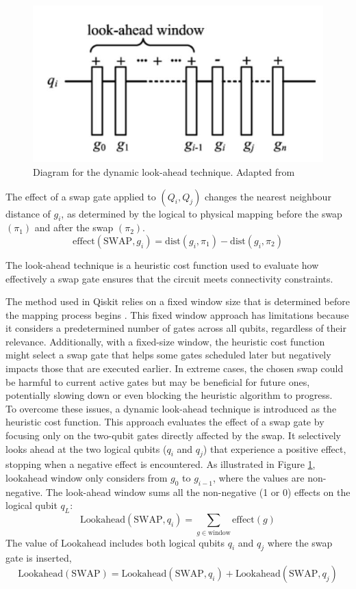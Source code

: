 \begin{figure}[h]
    \centering
    \includegraphics[width=0.5\linewidth]{image/lookahead_window.png}
    \caption{Diagram for the dynamic look-ahead technique. Adapted from \cite{zhu_dynamic_2020}}
    \label{fig:lookahead-window}
\end{figure}

The effect of a swap gate applied to $(Q_i, Q_j)$ changes the nearest neighbour distance of $g_i$, as determined by the logical to physical mapping before the swap $(\pi_1)$ and after the swap $(\pi_2)$.
\begin{equation}
    \text{effect}(\text{SWAP}, g_i) = \text{dist}(g_i, \pi_1) - \text{dist}(g_i, \pi_2)
\end{equation}

\begin{definition}
    The look-ahead technique is a heuristic cost function used to evaluate how effectively a swap gate ensures that the circuit meets connectivity constraints.
\end{definition}
The method used in Qiskit relies on a fixed window size that is determined before the mapping process begins \cite{ibmquantum_lookaheadswap}. This fixed window approach has limitations because it considers a predetermined number of gates across all qubits, regardless of their relevance. Additionally, with a fixed-size window, the heuristic cost function might select a swap gate that helps some gates scheduled later but negatively impacts those that are executed earlier. In extreme cases, the chosen swap could be harmful to current active gates but may be beneficial for future ones, potentially slowing down or even blocking the heuristic algorithm to progress. \\
To overcome these issues, a dynamic look-ahead technique is introduced as the heuristic cost function. This approach evaluates the effect of a swap gate by focusing only on the two-qubit gates directly affected by the swap. It selectively looks ahead at the two logical qubits ($q_i$ and $q_j$) that experience a positive effect, stopping when a negative effect is encountered. As illustrated in Figure \ref{fig:lookahead-window}, lookahead window only considers from $g_0$ to $g_{i-1}$, where the values are non-negative. The look-ahead window sums all the non-negative (1 or 0) effects on the logical qubit $q_L$:
\begin{equation}
    \text{Lookahead}(\text{SWAP}, q_i) = \sum_{g \in \text{window}} \text{effect}(g)
\end{equation}
The value of Lookahead includes both logical qubits $q_i$ and $q_j$ where the swap gate is inserted,
\begin{equation}
    \text{Lookahead}(\text{SWAP}) = \text{Lookahead}(\text{SWAP}, q_i) + \text{Lookahead}(\text{SWAP}, q_j)
\end{equation}


